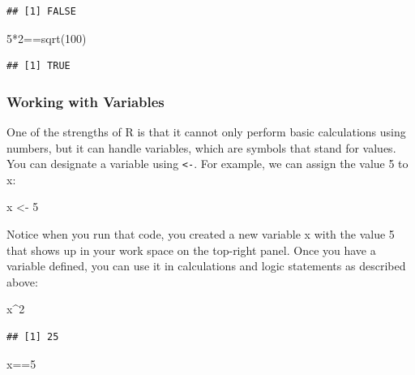 \documentclass[
]{book}
\newenvironment{Shaded}{\begin{snugshade}}{\end{snugshade}}
\newcommand{\DecValTok}[1]{\textcolor[rgb]{0.00,0.00,0.81}{#1}}
\newcommand{\FunctionTok}[1]{\textcolor[rgb]{0.00,0.00,0.00}{#1}}
\newcommand{\NormalTok}[1]{#1}
\newcommand{\OtherTok}[1]{\textcolor[rgb]{0.56,0.35,0.01}{#1}}
\newcommand{\SpecialCharTok}[1]{\textcolor[rgb]{0.00,0.00,0.00}{#1}}
\begin{document}
\begin{verbatim}
## [1] FALSE
\end{verbatim}

\begin{Shaded}
\begin{Highlighting}[]
\DecValTok{5}\SpecialCharTok{*}\DecValTok{2}\SpecialCharTok{==}\FunctionTok{sqrt}\NormalTok{(}\DecValTok{100}\NormalTok{)}
\end{Highlighting}
\end{Shaded}

\begin{verbatim}
## [1] TRUE
\end{verbatim}

\hypertarget{working-with-variables}{%
\subsubsection*{Working with Variables}\label{working-with-variables}}

One of the strengths of R is that it cannot only perform basic calculations using numbers, but it can handle variables, which are symbols that stand for values. You can designate a variable using \texttt{\textless{}-}. For example, we can assign the value 5 to x:

\begin{Shaded}
\begin{Highlighting}[]
\NormalTok{x }\OtherTok{\textless{}{-}} \DecValTok{5}
\end{Highlighting}
\end{Shaded}

Notice when you run that code, you created a new variable x with the value 5 that shows up in your work space on the top-right panel. Once you have a variable defined, you can use it in calculations and logic statements as described above:

\begin{Shaded}
\begin{Highlighting}[]
\NormalTok{x}\SpecialCharTok{\^{}}\DecValTok{2}
\end{Highlighting}
\end{Shaded}

\begin{verbatim}
## [1] 25
\end{verbatim}

\begin{Shaded}
\begin{Highlighting}[]
\NormalTok{x}\SpecialCharTok{==}\DecValTok{5}
\end{Highlighting}
\end{Shaded}
\end{document}

